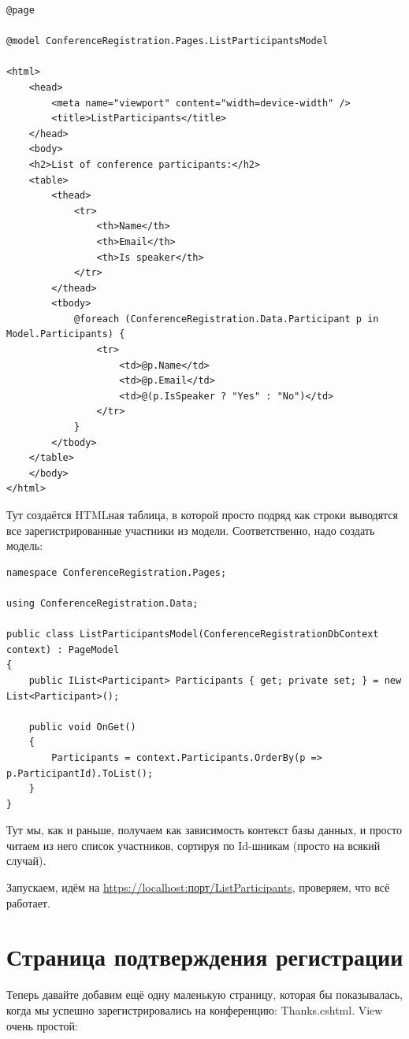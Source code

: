 \documentclass{../../text-style}
\begin{document}
\begin{verbatim}
@page

@model ConferenceRegistration.Pages.ListParticipantsModel

<html>
    <head>
        <meta name="viewport" content="width=device-width" />
        <title>ListParticipants</title>
    </head>
    <body>
    <h2>List of conference participants:</h2>
    <table>
        <thead>
            <tr>
                <th>Name</th>
                <th>Email</th>
                <th>Is speaker</th>
            </tr>
        </thead>
        <tbody>
            @foreach (ConferenceRegistration.Data.Participant p in Model.Participants) {
                <tr>
                    <td>@p.Name</td>
                    <td>@p.Email</td>
                    <td>@(p.IsSpeaker ? "Yes" : "No")</td>
                </tr>
            }
        </tbody>
    </table>
    </body>
</html>
\end{verbatim}

Тут создаётся HTMLная таблица, в которой просто подряд как строки выводятся все зарегистрированные участники из модели. Соответственно, надо создать модель:

\begin{verbatim}
namespace ConferenceRegistration.Pages;

using ConferenceRegistration.Data;

public class ListParticipantsModel(ConferenceRegistrationDbContext context) : PageModel
{
    public IList<Participant> Participants { get; private set; } = new List<Participant>();

    public void OnGet()
    {
        Participants = context.Participants.OrderBy(p => p.ParticipantId).ToList();
    }
}
\end{verbatim}

Тут мы, как и раньше, получаем как зависимость контекст базы данных, и просто читаем из него список участников, сортируя по Id-шникам (просто на всякий случай).

Запускаем, идём на \url{https://localhost:порт/ListParticipants}, проверяем, что всё работает.

\section{Страница подтверждения регистрации}

Теперь давайте добавим ещё одну маленькую страницу, которая бы показывалась, когда мы успешно зарегистрировались на конференцию: Thanks.cshtml. View очень простой:
\end{document}
